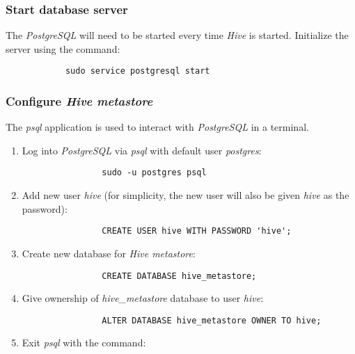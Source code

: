 \documentclass{article}
\begin{document}
        \subsubsection{Start database server}
        \label{subsec:pgsstart}
        The \emph{PostgreSQL} will need to be started every time \emph{Hive} is started. Initialize the
        server using the command:
        \begin{verbatim}
            sudo service postgresql start
        \end{verbatim}

        \subsubsection{Configure \emph{Hive metastore}}
        The \emph{psql} application is used to interact with \emph{PostgreSQL} in a terminal.
        \begin{enumerate}
            \item Log into \emph{PostgreSQL} via \emph{psql} with default user \emph{postgres}:
            \begin{verbatim}
                sudo -u postgres psql 
            \end{verbatim}

            \item Add new user \emph{hive}
            (for simplicity, the new user will also be given \emph{hive} as the password):
            \begin{verbatim}
                CREATE USER hive WITH PASSWORD 'hive';
            \end{verbatim}

            \item Create new database for \emph{Hive metastore}:
            \begin{verbatim}
                CREATE DATABASE hive_metastore;
            \end{verbatim}

            \item Give ownership of \emph{hive\_metastore} database to user \emph{hive}:
            \begin{verbatim}
                ALTER DATABASE hive_metastore OWNER TO hive;
            \end{verbatim}

            \item Exit \emph{psql} with the command: \texttt{\q}
        \end{enumerate}
\end{document}
